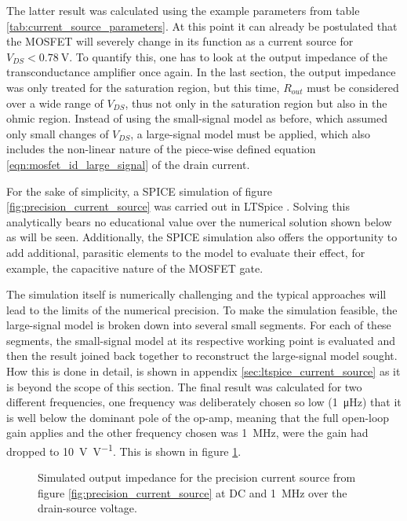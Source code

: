 The latter result was calculated using the example parameters from table \ref{tab:current_source_parameters}. At this point it can already be postulated that the MOSFET will severely change in its function as a current source for $V_{DS} < \qty{0.78}{\V}$. To quantify this, one has to look at the output impedance of the transconductance amplifier once again. In the last section, the output impedance was only treated for the saturation region, but this time, $R_{out}$ must be considered over a wide range of $V_{DS}$, thus not only in the saturation region but also in the ohmic region. Instead of using the small-signal model as before, which assumed only small changes of $V_{DS}$, a large-signal model must be applied, which also includes the non-linear nature of the piece-wise defined equation \ref{eqn:mosfet_id_large_signal} of the drain current.

For the sake of simplicity, a SPICE simulation of figure \ref{fig:precision_current_source} was carried out in LTSpice \cite{ltspice}. Solving this analytically bears no educational value over the numerical solution shown below as will be seen. Additionally, the SPICE simulation also offers the opportunity to add additional, parasitic elements to the model to evaluate their effect, for example, the capacitive nature of the MOSFET gate.

The simulation itself is numerically challenging and the typical approaches will lead to the limits of the numerical precision. To make the simulation feasible, the large-signal model is broken down into several small segments. For each of these segments, the small-signal model at its respective working point is evaluated and then the result joined back together to reconstruct the large-signal model sought. How this is done in detail, is shown in appendix \ref{sec:ltspice_current_source} as it is beyond the scope of this section. The final result was calculated for two different frequencies, one frequency was deliberately chosen so low (\qty{1}{\micro\Hz}) that it is well below the dominant pole of the op-amp, meaning that the full open-loop gain applies and the other frequency chosen was \qty{1}{\MHz}, were the gain had dropped to \qty[per-mode=power]{10}{\V \per V}. This is shown in figure \ref{fig:ltspice_output_impedance_simulation}.
\begin{figure}[ht]
    \centering
    \caption{Simulated output impedance for the precision current source from figure \ref{fig:precision_current_source} at DC and \qty{1}{\MHz} over the drain-source voltage.}
    \label{fig:ltspice_output_impedance_simulation}
\end{figure}

